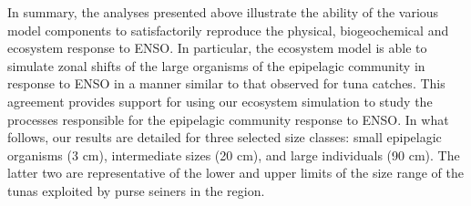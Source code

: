In summary, the analyses presented above illustrate the ability of the various model components to satisfactorily reproduce the physical, biogeochemical and ecosystem response to ENSO. In particular, the ecosystem model is able to simulate zonal shifts of the large organisms of the epipelagic community in response to ENSO in a manner similar to that observed for tuna catches. This agreement provides support for using our ecosystem simulation to study the processes responsible for the epipelagic community response to ENSO. In what follows, our results are detailed for three selected size classes: small epipelagic organisms (3 cm), intermediate sizes (20 cm), and large individuals (90 cm). The latter two are representative of the lower and upper limits of the size range of the tunas exploited by purse seiners in the region.

